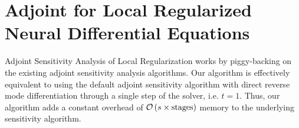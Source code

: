 \begin{table}[t]
  \centering
  \caption{\textbf{Memory Requirements for various Sensitivity Algorithms for ODEs with Local Regularization}}
  \label{tab:memory_requirements_sensitivity_analysis_odes_with_local_reg}
\end{table}

\section{Adjoint for Local Regularized Neural Differential Equations}
\label{sec:adjoint_for_local_regularized_neural_differential_equations}

Adjoint Sensitivity Analysis of Local Regularization works by piggy-backing on the existing adjoint sensitivity analysis algorithms. Our algorithm is effectively equivalent to using the default adjoint sensitivity algorithm with direct reverse mode differentiation through a single step of the solver, i.e. $ t = 1$. Thus, our algorithm adds a constant overhead of $\mathcal{O}\left(s \times \mathrm{stages}\right)$ memory to the underlying sensitivity algorithm.

